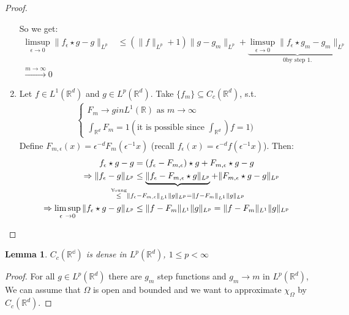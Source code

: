 \documentclass{report}
\theoremstyle{tommy}
\newtheorem{lem}[defn]{Lemma}
\begin{document}
\begin{proof}
\begin{enumerate}[label=Step \arabic*:]
      So we get:
      \begin{align*}
        \limsup_{\epsilon \to 0} \|f_\epsilon \star g - g\|_{L^p} 
        &\le (\|f\|_{L^p} + 1) \|g - g_m\|_{L^p} + \underbrace{\limsup_{\epsilon \to 0} \|f_\epsilon \star g_m - g_m\|_{L^p}}_{0 \text{by step 1.}} \\
        \xrightarrow{m \to \infty} 0
      \end{align*}
      \item Let \(f \in L^1(\mathbb{R}^d)\) and \(g \in L^p(\mathbb{R}^d)\). Take \(\{f_m\} \subseteq C_c(\mathbb{R}^d)\), s.t. 
      \begin{align*}
        \begin{cases}
          F_m \to g in L^1(\mathbb{R}) \text{ as } m \to \infty \\
          \int_{\mathbb{R}^d} F_m = 1 (\text{it is possible since } \int_{\mathbb{R}^d}) f = 1)
        \end{cases}
      \end{align*} 
      Define \(F_{m, \epsilon}(x) = \epsilon^{-d} F_m(\epsilon^{-1} x)\) (recall \(f_\epsilon(x) = \epsilon^{-d} f(\epsilon^{-1} x)\)). Then:
      \begin{align*}
        f_\epsilon \star g - g &= (f_\epsilon - F_{m, \epsilon}) \star g + F_{m, \epsilon} \star g -g \\
        \Rightarrow \|f_\epsilon - g \|_{L^p} &\le \underbrace{\|f_\epsilon - F_{m, \epsilon} \star g\|_{L^p}}_{\mathclap{\overset{\text{Young}}{\le} \|f_\epsilon - F_{m, \epsilon}\|_{L^1} \|g\|_{L^p} = \|f - F_m\|_{L^1} \|g\|_{L^p}}} + \|F_{m, \epsilon} \star g - g\|_{L^p} \\
        \Rightarrow \limsup_{\epsilon \to 0} \|f_\epsilon \star g - g\|_{L^p} &\le \|f - F_m\|_{L^1} \|g\|_{L^p} = \|f - F_m\|_{L^1} \|g \|_{L^p} \qedhere
      \end{align*}
    \end{enumerate}
  \end{proof}

  
  \begin{lem}
    \(C_c(\mathbb{{R}^d})\) is dense in \(L^p(\mathbb{R}^d)\), \(1 \le p < \infty\)
  \end{lem}

  \begin{proof}
    For all \(g \in L^p(\mathbb{R}^d)\) there are \(g_m\) step functions and \(g_m \to m\) in \(L^p(\mathbb{R}^d)\),
    We can assume that \(\Omega\) is open and bounded and we want to approximate \(\chi_\Omega\) by \(C_c(\mathbb{R}^d)\). 
  \end{proof}
\end{document}
